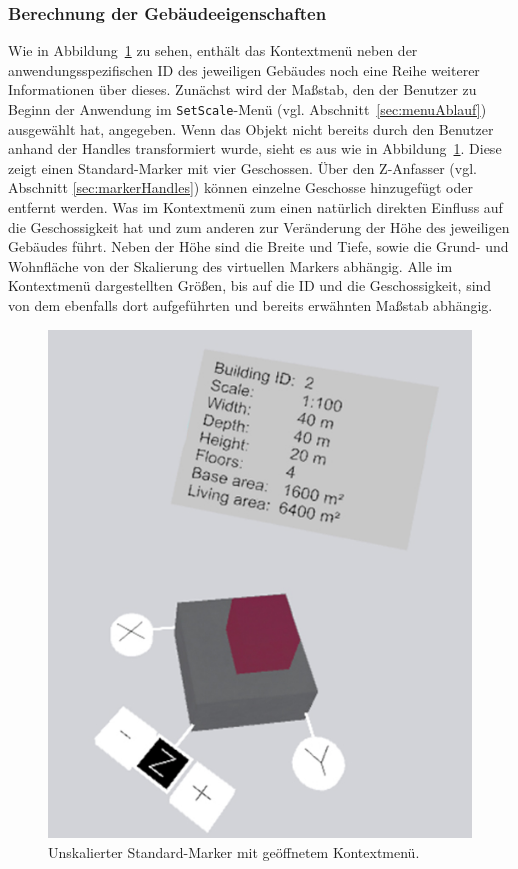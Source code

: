 \subsubsection{Berechnung der Gebäudeeigenschaften}\label{sec:KontextMenuInhalt}
Wie in Abbildung~\ref{fig:standardMarker} zu sehen, enthält das Kontextmenü neben der anwendungsspezifischen ID des jeweiligen Gebäudes noch eine Reihe weiterer Informationen über dieses.  Zunächst wird der Maßstab, den der Benutzer zu Beginn der Anwendung im \texttt{SetScale}-Menü (vgl. Abschnitt~\ref{sec:menuAblauf}) ausgewählt hat, angegeben. Wenn das Objekt nicht bereits durch den Benutzer anhand der Handles transformiert wurde, sieht es aus wie in Abbildung~\ref{fig:standardMarker}. Diese zeigt einen Standard-Marker mit vier Geschossen. Über den Z-Anfasser (vgl. Abschnitt \ref{sec:markerHandles}) können einzelne Geschosse hinzugefügt oder entfernt werden. Was im Kontextmenü zum einen natürlich direkten Einfluss auf die Geschossigkeit hat und zum anderen zur Veränderung der Höhe des jeweiligen Gebäudes führt. Neben der Höhe sind die Breite und Tiefe, sowie die Grund- und Wohnfläche von der Skalierung des virtuellen Markers abhängig. Alle im Kontextmenü dargestellten Größen, bis auf die ID und die Geschossigkeit, sind von dem ebenfalls dort aufgeführten und bereits erwähnten Maßstab abhängig. 

\begin{figure}
	\centering
	\includegraphics[scale=.3]{Bilder/Neue Screenshots/StandardMarker.jpg}
	\caption[Unskalierter Standard-Marker mit geöffnetem Kontextmenü]{Unskalierter Standard-Marker mit geöffnetem Kontextmenü.}
	\label{fig:standardMarker}
\end{figure}

